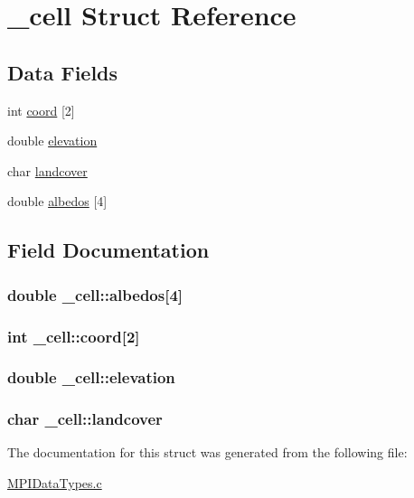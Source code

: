 \hypertarget{struct__cell}{\section{\-\_\-cell Struct Reference}
\label{struct__cell}
}
\subsection*{Data Fields}
\begin{DoxyCompactItemize}
\item 
int \hyperlink{struct__cell_a9be272aa3ca6654d85231bcd3590f3d8}{coord} \mbox{[}2\mbox{]}
\item 
double \hyperlink{struct__cell_a705a2494c30f912d5ceff1338193c5a9}{elevation}
\item 
char \hyperlink{struct__cell_a9b25becd5439e9ad849c5e95361478ad}{landcover}
\item 
double \hyperlink{struct__cell_adeb26be20eaf77e2e32a470ee357e82c}{albedos} \mbox{[}4\mbox{]}
\end{DoxyCompactItemize}


\subsection{Field Documentation}
\hypertarget{struct__cell_adeb26be20eaf77e2e32a470ee357e82c}{
\subsubsection[{albedos}]{\setlength{\rightskip}{0pt plus 5cm}double \-\_\-cell\-::albedos\mbox{[}4\mbox{]}}}\label{struct__cell_adeb26be20eaf77e2e32a470ee357e82c}
\hypertarget{struct__cell_a9be272aa3ca6654d85231bcd3590f3d8}{
\subsubsection[{coord}]{\setlength{\rightskip}{0pt plus 5cm}int \-\_\-cell\-::coord\mbox{[}2\mbox{]}}}\label{struct__cell_a9be272aa3ca6654d85231bcd3590f3d8}
\hypertarget{struct__cell_a705a2494c30f912d5ceff1338193c5a9}{
\subsubsection[{elevation}]{\setlength{\rightskip}{0pt plus 5cm}double \-\_\-cell\-::elevation}}\label{struct__cell_a705a2494c30f912d5ceff1338193c5a9}
\hypertarget{struct__cell_a9b25becd5439e9ad849c5e95361478ad}{
\subsubsection[{landcover}]{\setlength{\rightskip}{0pt plus 5cm}char \-\_\-cell\-::landcover}}\label{struct__cell_a9b25becd5439e9ad849c5e95361478ad}


The documentation for this struct was generated from the following file\-:\begin{DoxyCompactItemize}
\item 
\hyperlink{MPIDataTypes_8c}{M\-P\-I\-Data\-Types.\-c}\end{DoxyCompactItemize}
